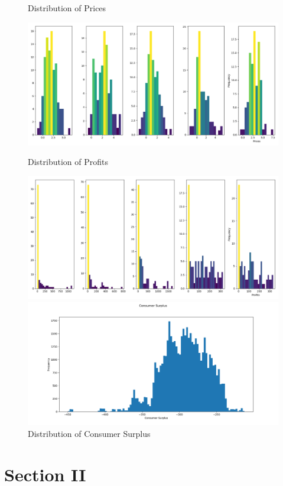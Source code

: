 \documentclass{article}
\begin{document}
\begin{figure}[h]
  \caption{Distribution of Prices}
  \centering
    \includegraphics[width=1.0\textwidth]{fig_hist_prices5_t}
  \caption{Distribution of Profits}
  \centering
    \includegraphics[width=1.0\textwidth]{fig_hist_profits5_t}
  \caption{Distribution of Consumer Surplus}
  \centering
    \includegraphics[width=1.0\textwidth]{fig_hist_consumersurplus5_t}
\end{figure}
\FloatBarrier

\newpage
\section{Section II}
\end{document}
